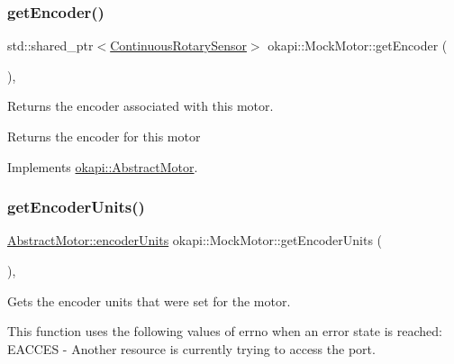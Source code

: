 \mbox{\label{classokapi_1_1MockMotor_acf282485528942597eb1b334fc7625d5}} 
\subsubsection{\texorpdfstring{getEncoder()}{getEncoder()}}
{\footnotesize\ttfamily std\+::shared\+\_\+ptr$<$\mbox{\hyperlink{classokapi_1_1ContinuousRotarySensor}{Continuous\+Rotary\+Sensor}}$>$ okapi\+::\+Mock\+Motor\+::get\+Encoder (\begin{DoxyParamCaption}{ }\end{DoxyParamCaption})\hspace{0.3cm}{\ttfamily [override]}, {\ttfamily [virtual]}}



Returns the encoder associated with this motor. 

\begin{DoxyReturn}{Returns}
the encoder for this motor 
\end{DoxyReturn}


Implements \mbox{\hyperlink{classokapi_1_1AbstractMotor_a87177280c20a855a74354dd8ba6e1d6a}{okapi\+::\+Abstract\+Motor}}.

\mbox{\label{classokapi_1_1MockMotor_a4cbe026162527d49d3ce6715a63880f5}} 
\subsubsection{\texorpdfstring{getEncoderUnits()}{getEncoderUnits()}}
{\footnotesize\ttfamily \mbox{\hyperlink{classokapi_1_1AbstractMotor_ae811cd825099f2defadeb1b7f7e7764c}{Abstract\+Motor\+::encoder\+Units}} okapi\+::\+Mock\+Motor\+::get\+Encoder\+Units (\begin{DoxyParamCaption}{ }\end{DoxyParamCaption})\hspace{0.3cm}{\ttfamily [override]}, {\ttfamily [virtual]}}



Gets the encoder units that were set for the motor. 

This function uses the following values of errno when an error state is reached\+: E\+A\+C\+C\+ES -\/ Another resource is currently trying to access the port.

